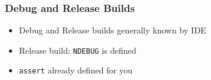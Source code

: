 \documentclass{../ucll-slides}
\begin{document}
\begin{frame}
  \frametitle{Debug and Release Builds}
  \begin{itemize}
    \item Debug and Release builds generally known by IDE
    \item Release build: {\tt NDEBUG} is defined
    \item {\tt assert} already defined for you
  \end{itemize}
\end{frame}
\end{document}
